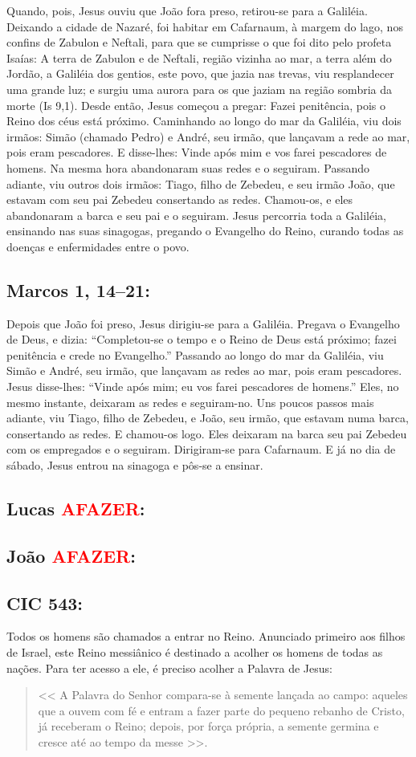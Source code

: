 \documentclass[10pt,a5paper]{book}
\newcommand{\from}[1]{\subsection*{#1}}
\newcommand{\TODO}{\textcolor{red}{\ttfamily AFAZER}}
\begin{document}
Quando, pois, Jesus ouviu que João fora preso, retirou-se para a Galiléia.
Deixando a cidade de Nazaré, foi habitar em Cafarnaum, à margem do lago, nos confins de Zabulon e Neftali,
para que se cumprisse o que foi dito pelo profeta Isaías:
A terra de Zabulon e de Neftali, região vizinha ao mar, a terra além do Jordão, a Galiléia dos gentios,
este povo, que jazia nas trevas, viu resplandecer uma grande luz; e surgiu uma aurora para os que jaziam na região sombria da morte (Is 9,1).
Desde então, Jesus começou a pregar: Fazei penitência, pois o Reino dos céus está próximo.
Caminhando ao longo do mar da Galiléia, viu dois irmãos: Simão (chamado Pedro) e André, seu irmão, que lançavam a rede ao mar, pois eram pescadores.
E disse-lhes: Vinde após mim e vos farei pescadores de homens.
Na mesma hora abandonaram suas redes e o seguiram.
Passando adiante, viu outros dois irmãos: Tiago, filho de Zebedeu, e seu irmão João, que estavam com seu pai Zebedeu consertando as redes. Chamou-os,
e eles abandonaram a barca e seu pai e o seguiram.
Jesus percorria toda a Galiléia, ensinando nas suas sinagogas, pregando o Evangelho do Reino, curando todas as doenças e enfermidades entre o povo.

\from{Marcos 1, 14--21:}

Depois que João foi preso, Jesus dirigiu-se para a Galiléia. Pregava o Evangelho de Deus, e dizia:
``Completou-se o tempo e o Reino de Deus está próximo; fazei penitência e crede no Evangelho.''
Passando ao longo do mar da Galiléia, viu Simão e André, seu irmão, que lançavam as redes ao mar, pois eram pescadores.
Jesus disse-lhes: ``Vinde após mim; eu vos farei pescadores de homens.''
Eles, no mesmo instante, deixaram as redes e seguiram-no.
Uns poucos passos mais adiante, viu Tiago, filho de Zebedeu, e João, seu irmão, que estavam numa barca, consertando as redes. E chamou-os logo.
Eles deixaram na barca seu pai Zebedeu com os empregados e o seguiram.
Dirigiram-se para Cafarnaum. E já no dia de sábado, Jesus entrou na sinagoga e pôs-se a ensinar.

\from{Lucas \TODO:}

\from{João \TODO:}

\from{CIC 543:}

Todos os homens são chamados a entrar no Reino. Anunciado primeiro aos filhos de Israel, este Reino messiânico é destinado a acolher os homens de todas as nações. Para ter acesso a ele, é preciso acolher a Palavra de Jesus:
\begin{quote}
<< A Palavra do Senhor compara-se à semente lançada ao campo: aqueles que a ouvem com fé e entram a fazer parte do pequeno rebanho de Cristo, já receberam o Reino; depois, por força própria, a semente germina e cresce até ao tempo da messe >>.
\end{quote}
\end{document}
